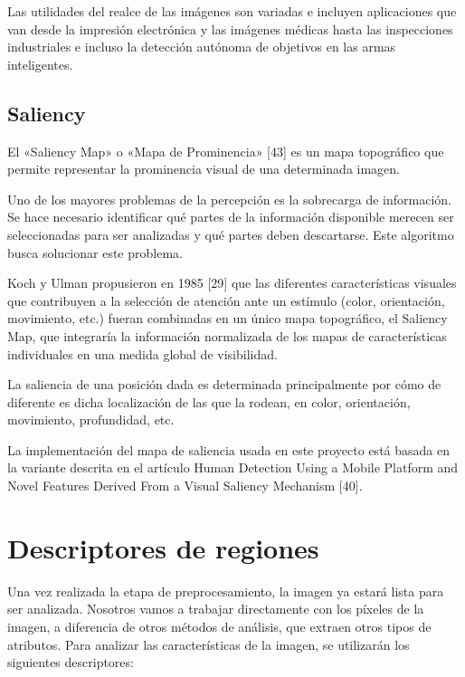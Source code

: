 Las utilidades del realce de las imágenes son variadas e incluyen aplicaciones que van desde
la impresión electrónica y las imágenes médicas hasta las inspecciones industriales e incluso la detección autónoma de objetivos en las armas inteligentes.

\subsection{Saliency}
El «Saliency Map» o «Mapa de Prominencia» [43] es un mapa topográfico que permite representar
la prominencia visual de una determinada imagen.

Uno de los mayores problemas de la percepción es la sobrecarga de información. Se hace necesario identificar qué partes de la información disponible merecen ser seleccionadas para ser analizadas y qué partes deben descartarse. Este algoritmo busca solucionar este problema.

Koch y Ulman propusieron en 1985 [29] que las diferentes características visuales que contribuyen a la selección de atención ante un estímulo (color, orientación, movimiento, etc.) fueran combinadas en un único mapa topográfico, el Saliency Map, que integraría la información normalizada de los mapas de características individuales en una medida global de visibilidad.

La saliencia de una posición dada es determinada principalmente por cómo de diferente es dicha
localización de las que la rodean, en color, orientación, movimiento, profundidad, etc.

La implementación del mapa de saliencia usada en este proyecto está basada en la variante
descrita en el artículo Human Detection Using a Mobile Platform and Novel Features Derived
From a Visual Saliency Mechanism [40].

\newpage


\section{Descriptores de regiones}
Una vez realizada la etapa de preprocesamiento, la imagen ya estará lista para ser analizada.
Nosotros vamos a trabajar directamente con los píxeles de la imagen, a diferencia de otros métodos de análisis, que extraen otros tipos de atributos. Para analizar las características de la imagen, se utilizarán los siguientes descriptores:

